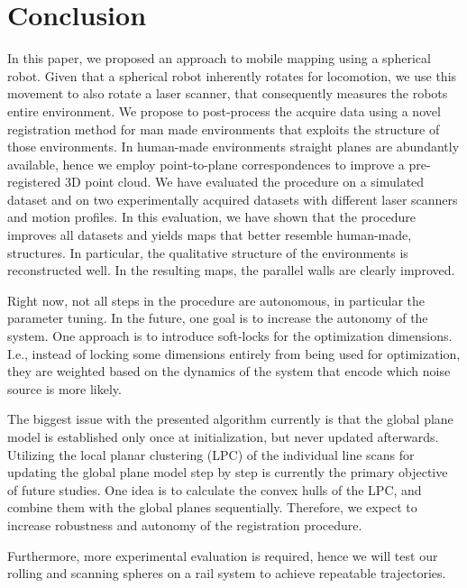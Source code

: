 \section{Conclusion}

In this paper, we proposed an approach to mobile mapping using a spherical robot. 
Given that a spherical robot inherently rotates for locomotion, we use this movement to also rotate a laser scanner, that consequently measures the robots entire environment.
We propose to post-process the acquire data using a novel registration method for man made environments that exploits the structure of those environments. 
In human-made environments straight planes are abundantly available, hence we employ point-to-plane correspondences to improve a pre-registered 3D point cloud. 
We have evaluated the procedure on a simulated dataset and on two experimentally acquired datasets with different laser scanners and motion profiles. 
In this evaluation, we have shown that the procedure improves all datasets and yields maps that better resemble human-made, structures. 
In particular, the qualitative structure of the environments is reconstructed well. 
In the resulting maps, the parallel walls are clearly improved.

%
Right now, not all steps in the procedure are autonomous, in particular the parameter tuning. 
In the future, one goal is to increase the autonomy of the system.
One approach is to introduce soft-locks for the optimization dimensions.
I.e., instead of locking some dimensions entirely from being used for optimization, they are weighted based on the dynamics of the system that encode which noise source is more likely.  

%
The biggest issue with the presented algorithm currently is that the global plane model is established only once at initialization, but never updated afterwards.
Utilizing the local planar clustering (LPC) of the individual line scans for updating the global plane model step by step is currently the primary objective of future studies.
One idea is to calculate the convex hulls of the LPC, and combine them with the global planes sequentially.
Therefore, we expect to increase robustness and autonomy of the registration procedure.

%
Furthermore, more experimental evaluation is required, hence we will test our rolling and scanning spheres on a rail system to achieve repeatable trajectories. 
